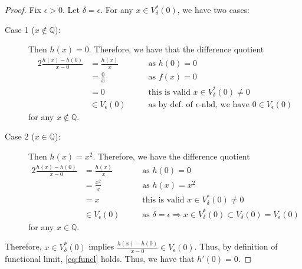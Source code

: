 \documentclass[10pt]{article}
\begin{document}
\begin{proof}
    Fix $\epsilon >0.$ Let $\delta = \epsilon.$ For any $x\in V_{\delta}^*(0)$, we have two cases:
    \begin{description}
        \item[Case 1 ($x\notin \mathbb{Q}$):]  Then $h(x)=0.$ Therefore, we have that the difference quotient
        \begin{alignat*}{2}
            \frac{h(x)-h(0)}{x-0} &= \frac{h(x)}{x} \qquad&&\text{as }h(0)=0 \\
            &= \frac{0}{x} &&\text{as }f(x)=0\\
            &= 0 &&\text{this is valid } x\in V_{\delta}^*(0)\neq 0\\
            &\in V_\epsilon(0) &&\text{as by def. of $\epsilon$-nbd, we have }0\in V_\epsilon(0)
        \end{alignat*}
        for any $x\notin\mathbb{Q}.$
        \item[Case 2 ($x\in\mathbb{Q}$):] Then $h(x)=x^2.$ Therefore,  we have the difference quotient
        \begin{alignat*}{2}
            \frac{h(x)-h(0)}{x-0} &= \frac{h(x)}{x} \qquad&&\text{as }h(0)=0 \\
            &= \frac{x^2}{x} &&\text{as }h(x)=x^2\\
            &= x &&\text{this is valid } x\in V_{\delta}^*(0)\neq 0\\
            &\in V_\epsilon(0) &&\text{as }\delta =\epsilon\Rightarrow x\in V_{\delta}^*(0)\subset V_{\delta}(0)=V_{\epsilon}(0)
        \end{alignat*}
        for any $x\in\mathbb{Q}.$
    \end{description}
    Therefore, $x\in V_{\delta}^*(0)$ implies $\frac{h(x)-h(0)}{x-0}\in V_{\epsilon}(0)$.
    Thus, by definition of functional limit, \eqref{eq:funcl} holds. Thus, we have that $h'(0)=0.$
\end{proof}
\end{document}
